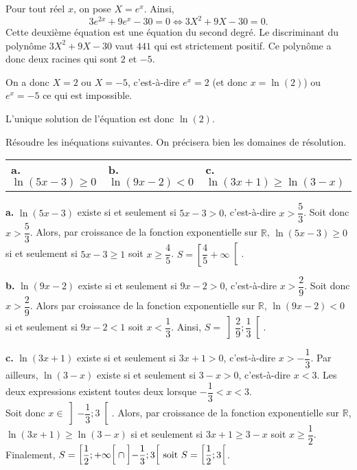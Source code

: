 \documentclass[11pt,fleqn, openany]{book} %
\begin{document}
\begin{solution}Pour tout réel $x$, on pose $X=e^x$. Ainsi, 
\[3e^{2x}+9e^x-30=0 \Leftrightarrow 3X^2+9X-30=0.\]
Cette deuxième équation est une équation du second degré. Le discriminant du polynôme $3X^2+9X-30$ vaut $441$ qui est strictement positif. Ce polynôme a donc deux racines qui sont $2$ et $-5$.

On a donc $X=2$ ou $X=-5$, c'est-à-dire $e^x = 2$ (et donc $x=\ln(2)$) ou $e^x=-5$ ce qui est impossible.

L'unique solution de l'équation est donc $\ln(2)$.\end{solution}




\begin{exercise}[topic=log01]Résoudre les inéquations suivantes. On précisera bien les domaines de résolution.

\begin{tabularx}{\linewidth}{XXX}\textbf{a.} $\ln(5x-3) \geqslant 0$ & \textbf{b.} $\ln(9x-2) < 0$ &\textbf{c.}  $\ln(3x+1) \geqslant \ln(3-x)$\end{tabularx}\end{exercise}

\begin{solution}\textbf{a.} $\ln(5x-3)$ existe si et seulement si $5x-3>0$, c'est-à-dire $x >\dfrac{5}{3}$. Soit donc \(x > \dfrac{5}{3}\). Alors, par croissance de la fonction exponentielle sur $\mathbb{R}$, \(\ln(5x-3) \geqslant 0\) si et seulement si \(5x-3 \geqslant 1\) soit \(x\geqslant \dfrac{4}{5}\). \(S = \left[\dfrac{4}{5} +\infty\right[\).

\textbf{b.} $\ln(9x-2)$ existe si et seulement si $9x-2>0$, c'est-à-dire $x >\dfrac{2}{9}$. Soit donc \(x > \dfrac{2}{9}\). Alors  par croissance de la fonction exponentielle sur $\mathbb{R}$, \(\ln(9x-2) < 0\) si et seulement si \(9x-2 < 1\) soit \(x< \dfrac{1}{3}\). Ainsi, \(S=\left]\dfrac{2}{9};\dfrac{1}{3}\right[\).

\textbf{c.} $\ln(3x+1)$ existe si et seulement si $3x+1>0$, c'est-à-dire $x >-\dfrac{1}{3}$. Par ailleurs, $\ln(3-x)$ existe si et seulement si $3-x>0$, c'est-à-dire $x<3$. Les deux expressions existent toutes deux lorsque $-\dfrac{1}{3}<x<3$. \\ Soit donc \(x \in \left]-\dfrac{1}{3};3\right[\). Alors,  par croissance de la fonction exponentielle sur $\mathbb{R}$, \(\ln(3x+1) \geqslant \ln(3-x)\) si et seulement si \(3x+1 \geqslant 3-x\) soit \(x \geqslant \dfrac{1}{2}\). Finalement, \(S=\left[\dfrac{1}{2};+\infty \right[ \cap  \left]-\dfrac{1}{3};3\right[$ soit \(S=\left[\dfrac{1}{2};3\right[\).\end{solution}
\end{document}
